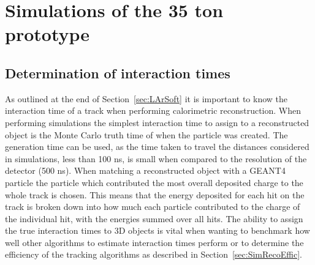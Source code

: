 \newcommand{\BigO}[1]{\ensuremath{\operatorname{O}\bigl(#1\bigr)}}


\chapter{Simulations of the 35 ton prototype}  %

\graphicspath{ {35tonSimulation/Figs/Raster/} {35tonSimulation/Figs/PDF/} {35tonSimulation/Figs/Vector/} }

\section{Determination of interaction times} \label{sec:SimInteractionTimes} %
As outlined at the end of Section~\ref{sec:LArSoft} it is important to know the interaction time of a track when performing calorimetric reconstruction. When performing simulations the simplest interaction time to assign to a reconstructed object is the Monte Carlo truth time of when the particle was created. The generation time can be used, as the time taken to travel the distances considered in simulations, less than 100 ns, is small when compared to the resolution of the detector (500 ns). When matching a reconstructed object with a GEANT4 particle the particle which contributed the most overall deposited charge to the whole track is chosen. This means that the energy deposited for each hit on the track is broken down into how much each particle contributed to the charge of the individual hit, with the energies summed over all hits. The ability to assign the true interaction times to 3D objects is vital when wanting to benchmark how well other algorithms to estimate interaction times perform or to determine the efficiency of the tracking algorithms as described in Section~\ref{sec:SimRecoEffic}. \\

